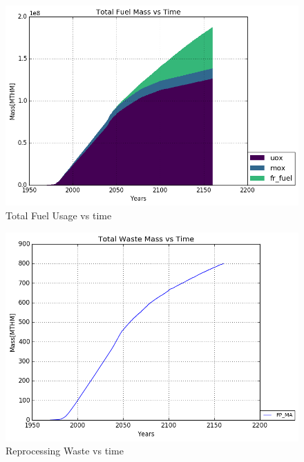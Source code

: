 \begin{figure}
	\includegraphics[width=\linewidth]{./images/fr/total_fuel.png}
	\caption{Total Fuel Usage vs time}
	\label{fig:fr_fuel}
\end{figure}

\begin{figure}
	\includegraphics[width=\linewidth]{./images/fr/FP_MA_total_Waste.png}
	\caption{Reprocessing Waste vs time}
	\label{fig:fr_rep_waste}
\end{figure}

